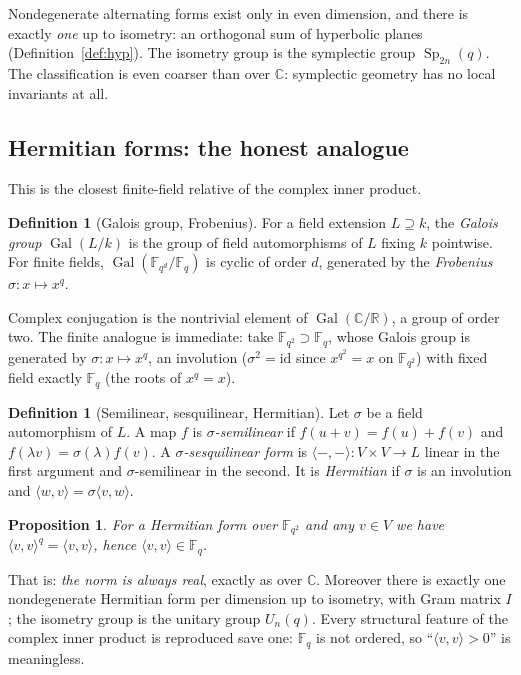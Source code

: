 \documentclass[11pt,a4paper]{article}
\newtheorem{proposition}[theorem]{Proposition}
\theoremstyle{definition}
\newtheorem{definition}[theorem]{Definition}
\theoremstyle{remark}
\newcommand{\FF}{\mathbb{F}}
\newcommand{\CC}{\mathbb{C}}
\newcommand{\RR}{\mathbb{R}}
\newcommand{\ip}[2]{\langle #1, #2 \rangle}
\DeclareMathOperator{\Gal}{Gal}
\DeclareMathOperator{\Sp}{Sp}
\begin{document}
Nondegenerate alternating forms exist only in even dimension, and there is exactly \emph{one}
up to isometry: an orthogonal sum of hyperbolic planes (Definition~\ref{def:hyp}). The
isometry group is the symplectic group $\Sp_{2n}(q)$. The classification is even coarser than
over $\CC$: symplectic geometry has no local invariants at all.

\subsection{Hermitian forms: the honest analogue}

This is the closest finite-field relative of the complex inner product.

\begin{definition}[Galois group, Frobenius]
For a field extension $L \supseteq k$, the \emph{Galois group} $\Gal(L/k)$ is the group of
field automorphisms of $L$ fixing $k$ pointwise. For finite fields, $\Gal(\FF_{q^{d}}/\FF_q)$
is cyclic of order $d$, generated by the \emph{Frobenius} $\sigma : x \mapsto x^{q}$.
\end{definition}

Complex conjugation is the nontrivial element of $\Gal(\CC/\RR)$, a group of order two. The
finite analogue is immediate: take $\FF_{q^{2}} \supset \FF_q$, whose Galois group is
generated by $\sigma : x \mapsto x^{q}$, an involution ($\sigma^{2} = \mathrm{id}$ since
$x^{q^{2}} = x$ on $\FF_{q^{2}}$) with fixed field exactly $\FF_q$ (the roots of $x^{q} = x$).

\begin{definition}[Semilinear, sesquilinear, Hermitian]\label{def:sesq}
Let $\sigma$ be a field automorphism of $L$. A map $f$ is \emph{$\sigma$-semilinear} if
$f(u+v) = f(u)+f(v)$ and $f(\lambda v) = \sigma(\lambda) f(v)$. A
\emph{$\sigma$-sesquilinear form} is $\ip{-}{-} : V \times V \to L$ linear in the first
argument and $\sigma$-semilinear in the second. It is \emph{Hermitian} if $\sigma$ is an
involution and $\ip{w}{v} = \sigma\ip{v}{w}$.
\end{definition}

\begin{proposition}
For a Hermitian form over $\FF_{q^{2}}$ and any $v \in V$ we have $\ip{v}{v}^{q} = \ip{v}{v}$,
hence $\ip{v}{v} \in \FF_q$.
\end{proposition}

That is: \emph{the norm is always real}, exactly as over $\CC$. Moreover there is exactly one
nondegenerate Hermitian form per dimension up to isometry, with Gram matrix $I$; the isometry
group is the unitary group $U_n(q)$. Every structural feature of the complex inner product is
reproduced save one: $\FF_q$ is not ordered, so ``$\ip{v}{v} > 0$'' is meaningless.
\end{document}
